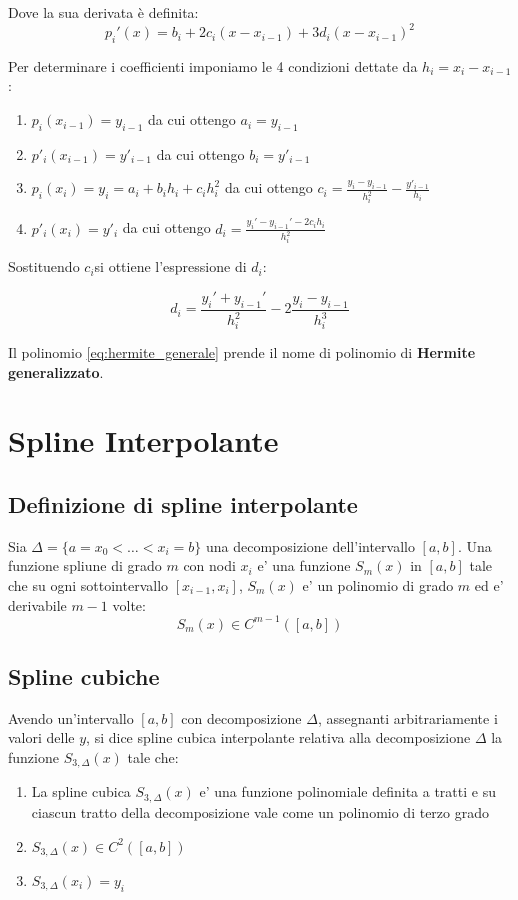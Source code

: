Dove la sua derivata è definita:
\begin{equation}
  p_i'(x) = b_i + 2c_i(x-x_{i-1}) + 3d_i(x-x_{i-1})^2
\end{equation}



Per determinare i coefficienti imponiamo le 4 condizioni dettate da $h_i = x_i - x_{i-1}$:
\begin{enumerate}
  \item $p_i(x_{i-1}) = y_{i-1}$ da cui ottengo $a_i= y_{i-1}$
  \item $p'_i(x_{i-1}) = y'_{i-1}$ da cui ottengo $b_i = y'_{i-1}$
  \item $p_i(x_i) = y_i = a_i + b_ih_i + c_ih^2_i$ da cui ottengo $c_i = \frac{y_i-y_{i-1}}{h_i^2} - \frac{y'_{i-1}}{h_i}$
  \item $p'_i(x_i) = y'_i$ da cui ottengo $d_i = \frac{y_i'-y_{i-1}'-2c_ih_i}{h_i^2}$
\end{enumerate}


Sostituendo $c_i$si ottiene l'espressione di $d_i$:

\begin{equation}
  d_i = \frac{y_i' + y_{i-1}'}{h_i^2} - 2 \frac{y_i - y_{i-1}}{h_i^3} 
\end{equation}

Il polinomio \ref{eq:hermite_generale} prende il nome di polinomio di \textbf{Hermite generalizzato}.

\section{Spline Interpolante}
\subsection{Definizione di spline interpolante}
Sia $\Delta = \{a = x_0 < \dots < x_i = b\}$ una decomposizione dell'intervallo $[a, b]$. Una funzione spliune di grado $m$
con nodi $x_i$ e' una funzione $S_m(x)$ in $[a, b]$ tale che su ogni sottointervallo $[x_{i-1}, x_i]$, $S_m(x)$ e' 
un polinomio di grado $m$ ed e' derivabile $m-1$ volte:
\begin{equation}
  S_m(x) \in C^{m-1}([a, b])
\end{equation}

\subsection{Spline cubiche}
Avendo un'intervallo $[a, b]$ con decomposizione $\Delta$, assegnanti arbitrariamente i valori delle $y$, si dice spline cubica interpolante relativa alla decomposizione
$\Delta$ la funzione $S_{3,\Delta}(x)$ tale che:
\begin{enumerate}
  \item La spline cubica $S_{3,\Delta}(x)$ e' una funzione polinomiale definita a tratti e su ciascun tratto della decomposizione vale come un polinomio di terzo grado
  \item $S_{3,\Delta}(x) \in C^2([a, b])$
  \item $S_{3,\Delta}(x_i) = y_i$
\end{enumerate}


